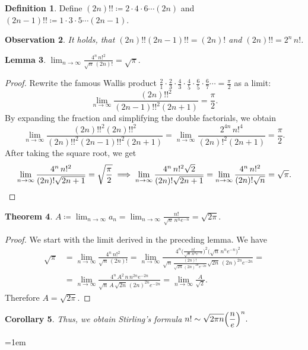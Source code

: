 \documentclass[11pt]{amsart}
\theoremstyle{plain}
\newtheorem{theorem}{Theorem}  %
\newtheorem{lemma}[theorem]{Lemma}
\newtheorem{observation}[theorem]{Observation}
\newtheorem{corollary}[theorem]{Corollary}
\theoremstyle{definition}
\newtheorem{definition}[theorem]{Definition}
\theoremstyle{remark}
\begin{document}
\begin{definition}
    Define $(2n)!! \coloneqq 2\cdot4\cdot6\cdots(2n)$ and $(2n-1)!! \coloneqq 1\cdot3\cdot5\cdots(2n-1)$. 
\end{definition}
\begin{observation}
    It holds, that $(2n)!!(2n-1)!! = (2n)!$ and $(2n)!! = 2^n\,n!$. 
\end{observation}

\begin{lemma}
    $\displaystyle \lim_{n\to\infty} \frac{4^n\,n!^2}{\sqrt{n}\,(2n)!} = \sqrt{\pi}.$
\end{lemma}
\begin{proof}
    Rewrite the famous Wallis product $\displaystyle \frac{2}{1}\cdot \frac{2}{3}\cdot \frac{4}{3}\cdot \frac{4}{5}\cdot \frac{6}{5}\cdot \frac{6}{7} \cdots = \frac{\pi}{2}$ as a limit:
    \[
    \lim_{n\to\infty} \frac{(2n)!!^2}{(2n-1)!!^2(2n+1)} = \frac{\pi}{2}.
    \]
    By expanding the fraction and simplifying the double factorials, we obtain
    \[
    \lim_{n\to\infty} \frac{(2n)!!^2 (2n)!!^2}{(2n)!!^2 (2n-1)!!^2(2n+1)} = \lim_{n\to\infty} \frac{2^{4n}\,n!^4}{(2n)!^2(2n+1)} = \frac{\pi}{2}.
    \]
    After taking the square root, we get 
    \[
    \lim_{n\to\infty} \frac{4^n\,n!^2}{(2n)!\sqrt{2n+1}} = \sqrt{\frac{\pi}{2}}
    \implies \lim_{n\to\infty} \frac{4^n\,n!^2 \sqrt{2}}{(2n)!\sqrt{2n+1}} = \lim_{n\to\infty} \frac{4^n\,n!^2}{(2n)!\sqrt{n}} = \sqrt{\pi}.\qedhere
    \]
\end{proof}

\begin{theorem}
    $\displaystyle A \coloneqq \lim_{n\to\infty} a_n = \lim_{n\to\infty} \frac{n!}{\sqrt{n}\,n^ne^{-n}} = \sqrt{2\pi}.$
\end{theorem}
\begin{proof}
    We start with the limit derived in the preceding lemma. We have
    \begin{equation*}
    \begin{split}
         \sqrt{\pi} &= \lim_{n\to\infty} \frac{4^n\,n!^2}{\sqrt{n}\,(2n)!} = \lim_{n\to\infty} \frac
        {4^n \biggl(\displaystyle\frac{n!}{\sqrt{n}\,n^ne^{-n}} \biggr)^2 \bigl( \sqrt{n}\,n^ne^{-n} \bigr)^2}
        {\sqrt{n}\, \displaystyle\frac{(2n)!}{\sqrt{2n}\,(2n)^{2n}e^{-2n}} \sqrt{2n}\,(2n)^{2n}e^{-2n}} =\\
        &= \lim_{n\to\infty} \frac{4^n\,A^2\,n\,n^{2n}e^{-2n}}{\sqrt{n}\,A\,\sqrt{2n}\,(2n)^{2n}e^{-2n}} = \lim_{n\to\infty}\frac{A}{\sqrt{2}}.
    \end{split}
    \end{equation*}
    Therefore $A = \sqrt{2\pi}.$ 
\end{proof}

\begin{corollary} Thus, we obtain Stirling's formula $\displaystyle n! \sim \sqrt{2\pi n}\Bigl(\frac{n}{e}\Bigr)^n.$ 
\end{corollary}

\emergencystretch=1em
\printbibliography
\end{document}
